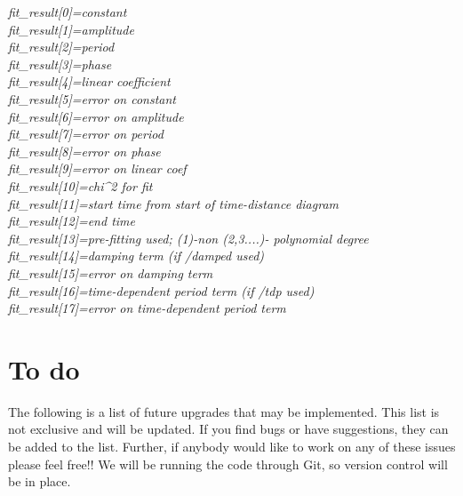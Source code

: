 \documentclass{article}
\begin{document}
\textit{fit\_result[0]=constant\\
fit\_result[1]=amplitude\\
fit\_result[2]=period\\
fit\_result[3]=phase\\
fit\_result[4]=linear coefficient\\
fit\_result[5]=error on constant\\
fit\_result[6]=error on amplitude\\
fit\_result[7]=error on period\\
fit\_result[8]=error on phase\\
fit\_result[9]=error on linear coef\\
fit\_result[10]=chi\^{}2 for fit\\
fit\_result[11]=start time from start of time-distance diagram\\
fit\_result[12]=end time\\
fit\_result[13]=pre-fitting used; (1)-non (2,3....)- polynomial degree\\
fit\_result[14]=damping term (if /damped used)\\
fit\_result[15]=error on damping term\\
fit\_result[16]=time-dependent period term (if /tdp used)\\
fit\_result[17]=error on time-dependent period term\\
}


\section{To do}
The following is a list of future upgrades that may be implemented. This list is not exclusive and will be updated. If you find bugs or have suggestions, they can be added to 
the list. Further, if anybody would like to work on any of these issues please feel free!! We will be running the code through Git, so version control will be in place.\\
\end{document}
